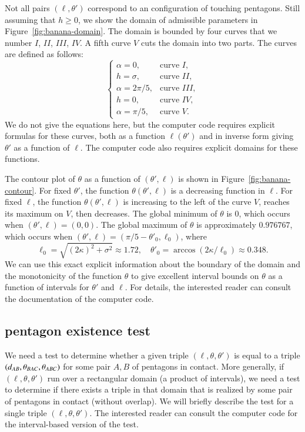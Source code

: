 Not all pairs $(\ell,\theta')$ correspond to an configuration of touching pentagons.
Still assuming that $h\ge0$, we show the domain of admissible parameters in Figure~\ref{fig:banana-domain}.
The domain is bounded by four curves that we number $I$, $II$, $III$, $IV$.  A fifth curve $V$ cuts the domain
into two parts.
The curves are defined as follows:
\[
\begin{cases}
\alpha = 0, &\text{curve } I,\\
h = \sigma, &\text{curve } II,\\
\alpha = 2\pi/5, &\text{curve } III,\\
h = 0, & \text{curve } IV,\\
\alpha = \pi/5, & \text{curve } V.
\end{cases}
\]
We do not give the equations here, but the computer code requires explicit formulas for these curves, both
as a function $\ell(\theta')$ and in inverse form giving $\theta'$ as a function of $\ell$.  The computer code
also requires explicit domains for these functions.


The contour plot of $\theta$ as a function of $(\theta',\ell)$ is shown in Figure~\ref{fig:banana-contour}.
For fixed $\theta'$, the function $\theta(\theta',\ell)$ is a decreasing function in $\ell$.  For fixed
$\ell$, the function $\theta(\theta',\ell)$ is increasing to the left of the curve $V$, reaches its maximum on $V$,
then decreases.  The global minimum of $\theta$ is $0$, which occurs when $(\theta',\ell)=(0,0)$.  The global maximum
of $\theta$ is approximately $0.976767$, which occurs when $(\theta',\ell) = (\pi/5 - \theta'_0,\ell_0)$,
where 
\[
\ell_0 = \sqrt{(2\kappa)^2 + \sigma^2}\approx 1.72,\quad
\theta'_0 = \arccos (2\kappa/\ell_0) \approx 0.348.
\]
We can use this exact explicit information about the boundary of the domain and the monotonicity of the function
$\theta$ to give excellent interval bounds on $\theta$ as a function of intervals for $\theta'$ and $\ell$.
For details, the interested reader can consult the documentation of the computer code.


\subsection{pentagon existence test}

We need a test to determine whether a given triple $(\ell,\theta,\theta')$ is equal
to a triple $(d_{AB},\theta_{BAC},\theta_{ABC})$ for some pair $A,B$ of pentagons
in contact.  More generally, if $(\ell,\theta,\theta')$ run over a rectangular domain (a product of intervals),
we need a test to determine if there exists a triple in that domain that is realized
by some pair of pentagons in contact (without overlap).  We will briefly describe the test for a single triple
$(\ell,\theta,\theta')$.  The interested reader can consult the computer code for the interval-based
version of the test.

